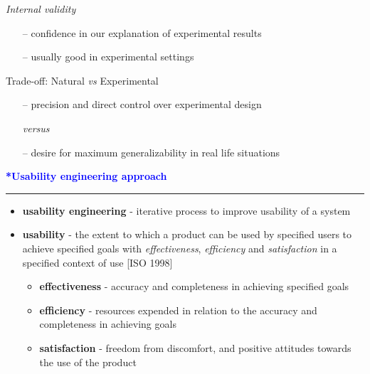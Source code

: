 \documentclass[pdf]{beamer}
\begin{document}
{{\begin{frame}
    \bigskip

       \textit{Internal validity}\par
    \begin{itemize}
    \item[\textcolor{black}{--}] confidence in our explanation of experimental results
    \item[\textcolor{black}{--}] usually good in experimental settings
    \end{itemize}
    
    \bigskip
    \bigskip
    
      Trade-off: Natural \textit{vs} Experimental\par
    \begin{itemize}
    \item[\textcolor{black}{--}] precision and direct control over experimental design 
    
    \textit{versus}
    
    \item[\textcolor{black}{--}] desire for maximum generalizability in real life situations
    \end{itemize}
    
    \bigskip
    \bigskip
\end{frame}}



{
\begin{frame}
    \textcolor{Blue}{\textbf{\Large{*Usability engineering approach}}}
    \textcolor{red}{\rule{10cm}{1mm}}

	\begin{itemize}
	\item 
		\textbf{usability engineering} - iterative process to improve usability of a system
	
	\item
		\textbf{usability} - the extent to which a product can be used by specified users to achieve specified goals with \textit{effectiveness}, \textit{efficiency} and \textit{satisfaction} in a specified context of use [ISO 1998]
		
		\begin{itemize}
		\item
		\textbf{effectiveness} - accuracy and completeness in achieving specified goals
		\item
		\textbf{efficiency} -  resources expended in relation to the accuracy and completeness in achieving goals
		\item
		\textbf{satisfaction} - freedom from discomfort, and positive attitudes towards the use of the product
		\end{itemize}
	\end{itemize}
\end{frame}}



}
\end{document}
